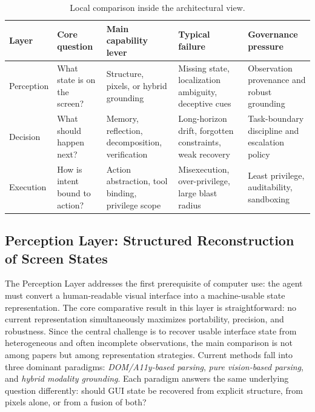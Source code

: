 \begin{table}[!t]
\centering
\scriptsize
\caption{Local comparison inside the architectural view.}
\label{tab:architecture_comparison}
\renewcommand{\arraystretch}{1.08}
\setlength{\tabcolsep}{3.5pt}
\begin{tabularx}{\textwidth}{L{1.55cm} L{2.25cm} L{2.7cm} L{2.9cm} Y}
\toprule
\textbf{Layer} & \textbf{Core question} & \textbf{Main capability lever} & \textbf{Typical failure} & \textbf{Governance pressure} \\
\midrule
Perception & What state is on the screen? & Structure, pixels, or hybrid grounding & Missing state, localization ambiguity, deceptive cues & Observation provenance and robust grounding \\
Decision & What should happen next? & Memory, reflection, decomposition, verification & Long-horizon drift, forgotten constraints, weak recovery & Task-boundary discipline and escalation policy \\
Execution & How is intent bound to action? & Action abstraction, tool binding, privilege scope & Misexecution, over-privilege, large blast radius & Least privilege, auditability, sandboxing \\
\bottomrule
\end{tabularx}
\end{table}

\subsection{Perception Layer: Structured Reconstruction of Screen States}

The Perception Layer addresses the first prerequisite of computer use: the agent must convert a human-readable visual interface into a machine-usable state representation. The core comparative result in this layer is straightforward: no current representation simultaneously maximizes portability, precision, and robustness. Since the central challenge is to recover usable interface state from heterogeneous and often incomplete observations, the main comparison is not among papers but among representation strategies. Current methods fall into three dominant paradigms: \emph{DOM/A11y-based parsing}, \emph{pure vision-based parsing}, and \emph{hybrid modality grounding}. Each paradigm answers the same underlying question differently: should GUI state be recovered from explicit structure, from pixels alone, or from a fusion of both?

